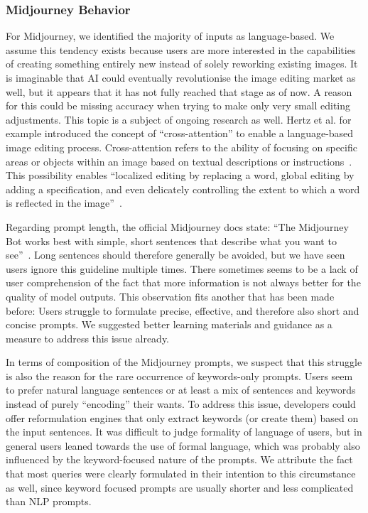 \subsubsection{Midjourney Behavior}
For Midjourney, we identified the majority of inputs as language-based.
We assume this tendency exists because users are more interested in the capabilities of creating
something entirely new instead of solely reworking existing images.
It is imaginable that AI could eventually revolutionise the image editing market as well, but
it appears that it has not fully reached that stage as of now.
A reason for this could be missing accuracy when trying to make only very small editing adjustments.
This topic is a subject of ongoing research as well.
Hertz et al\(.\) for example
introduced the concept of ``cross-attention'' to enable a language-based image editing process.
Cross-attention refers to the ability of focusing on specific areas or objects within an image
based on textual descriptions or instructions~\cite{hertz_prompt--prompt_2022}.
This possibility enables ``localized editing by replacing a word, global editing by adding a
specification, and even delicately controlling the extent to which a word is reflected in the
image''~\cite{hertz_prompt--prompt_2022}.

Regarding prompt length, the official Midjourney docs state: ``The Midjourney Bot works best with
simple, short sentences that describe what you want to see''~\cite{midjourney_documentation_2023}.
Long sentences should therefore generally be avoided, but we have seen users ignore this guideline
multiple times.
There sometimes seems to be a lack of user comprehension of the fact that more information is not
always better for the quality of model outputs.
This observation fits another that has been made before:
Users struggle to formulate precise, effective, and therefore also short and concise prompts.
We suggested better learning materials and guidance as a measure to address this issue already.

In terms of composition of the Midjourney prompts, we suspect that this struggle is also the reason
for the rare occurrence of keywords-only prompts.
Users seem to prefer natural language sentences or at least a mix of sentences and keywords
instead of purely ``encoding'' their wants.
To address this issue, developers could offer reformulation engines that only extract keywords (or
create them) based on the input sentences.
It was difficult to judge formality of language of users, but in general users leaned towards the
use of formal language, which was probably also influenced by the keyword-focused nature of the prompts.
We attribute the fact that most queries were clearly formulated in their intention to this
circumstance as well,
since keyword focused prompts are usually shorter and less complicated than NLP prompts.

